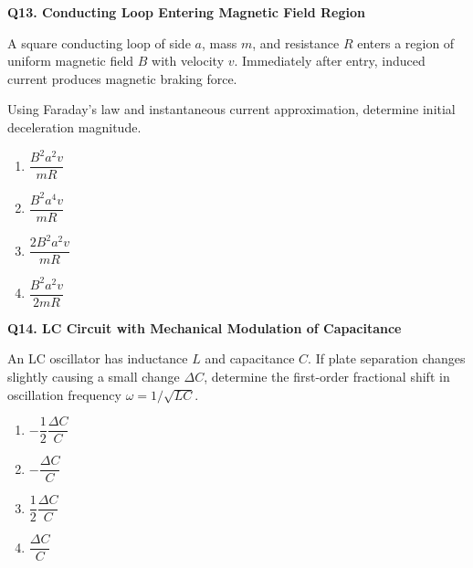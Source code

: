 \documentclass[12pt]{article}
\begin{document}
\textbf{Q13. Conducting Loop Entering Magnetic Field Region}



A square conducting loop of side $a$, mass $m$, and resistance $R$ enters a region of uniform magnetic field $B$ with velocity $v$. Immediately after entry, induced current produces magnetic braking force.

Using Faraday’s law and instantaneous current approximation, determine initial deceleration magnitude.

\begin{center}
\end{center}

\begin{enumerate}
\item[(A)] $\dfrac{B^2 a^2 v}{mR}$
\item[(B)] $\dfrac{B^2 a^4 v}{mR}$
\item[(C)] $\dfrac{2B^2 a^2 v}{mR}$
\item[(D)] $\dfrac{B^2 a^2 v}{2mR}$
\end{enumerate}

\textbf{Q14. LC Circuit with Mechanical Modulation of Capacitance}

An LC oscillator has inductance $L$ and capacitance $C$. If plate separation changes slightly causing a small change $\Delta C$, determine the first-order fractional shift in oscillation frequency $\omega = 1/\sqrt{LC}$.

\begin{enumerate}
\item[(A)] $-\dfrac12 \dfrac{\Delta C}{C}$
\item[(B)] $-\dfrac{\Delta C}{C}$
\item[(C)] $\dfrac12 \dfrac{\Delta C}{C}$
\item[(D)] $\dfrac{\Delta C}{C}$
\end{enumerate}
\end{document}
